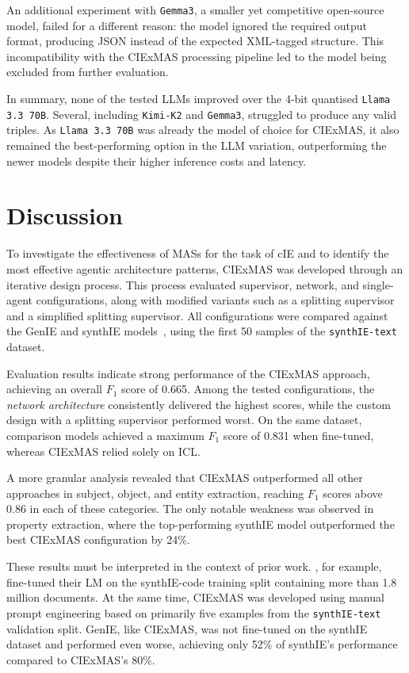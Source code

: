\documentclass[a4paper,oneside,bibliography=totoc]{scrbook}
\begin{document}
An additional experiment with \texttt{Gemma3}, a smaller yet competitive open-source model, failed for a different reason: the model ignored the required output format, producing JSON instead of the expected \ac{XML}-tagged structure. This incompatibility with the CIExMAS processing pipeline led to the model being excluded from further evaluation.

In summary, none of the tested \acp{LLM} improved over the 4-bit quantised \texttt{Llama 3.3 70B}. Several, including \texttt{Kimi-K2} and \texttt{Gemma3}, struggled to produce any valid triples. As \texttt{Llama 3.3 70B} was already the model of choice for CIExMAS, it also remained the best-performing option in the LLM variation, outperforming the newer models despite their higher inference costs and latency.

\section{Discussion}
\label{sec:discussion}

To investigate the effectiveness of \acp{MAS} for the task of \ac{cIE} and to identify the most effective agentic architecture patterns, CIExMAS was developed through an iterative design process. This process evaluated supervisor, network, and single-agent configurations, along with modified variants such as a splitting supervisor and a simplified splitting supervisor. All configurations were compared against the GenIE and synthIE models~\cite{Josifoski2021,Josifoski2023}, using the first 50 samples of the \texttt{synthIE-text} dataset.

Evaluation results indicate strong performance of the CIExMAS approach, achieving an overall $F_{1}$ score of 0.665. Among the tested configurations, the \textit{network architecture} consistently delivered the highest scores, while the custom design with a splitting supervisor performed worst. On the same dataset, comparison models achieved a maximum $F_{1}$ score of 0.831 when fine-tuned, whereas CIExMAS relied solely on \ac{ICL}.

A more granular analysis revealed that CIExMAS outperformed all other approaches in subject, object, and entity extraction, reaching $F_{1}$ scores above 0.86 in each of these categories. The only notable weakness was observed in property extraction, where the top-performing synthIE model outperformed the best CIExMAS configuration by 24\%.

These results must be interpreted in the context of prior work. \citet{Josifoski2023}, for example, fine-tuned their \ac{LM} on the synthIE-code training split containing more than 1.8 million documents. At the same time, CIExMAS was developed using manual prompt engineering based on primarily five examples from the \texttt{synthIE-text} validation split. GenIE, like CIExMAS, was not fine-tuned on the synthIE dataset and performed even worse, achieving only 52\% of synthIE's performance compared to CIExMAS's 80\%.
\end{document}
